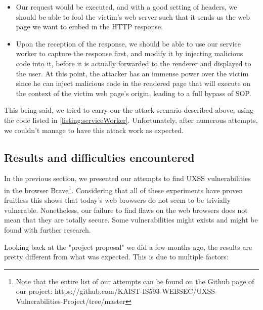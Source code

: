 \documentclass[journal]{IEEEtran}
\begin{document}
\begin{itemize}
\item Our request would be executed, and with a good setting of headers, we should be able to fool the victim's web server such that it sends us the web page we want to embed in the HTTP response.
\item Upon the reception of the response, we should be able to use our service worker to capture the response first, and modify it by injecting malicious code into it, before it is actually forwarded to the renderer and displayed to the user. At this point, the attacker has an immense power over the victim since he can inject malicious code in the rendered page that will execute on the context of the victim web page's origin, leading to a full bypass of SOP.
\end{itemize}

\medskip

This being said, we tried to carry our the attack scenario described above, using the code listed in \ref{listing:serviceWorker}. Unfortunately, after numerous attempts, we couldn't manage to have this attack work as expected. 


\subsection{Results and difficulties encountered}

In the previous section, we presented our attempts to find UXSS vulnerabilities in the browser Brave\footnote{Note that the entire list of our attempts can be found on the Github page of our project: https://github.com/KAIST-IS593-WEBSEC/UXSS-Vulnerabilities-Project/tree/master}. Considering that all of these experiments have proven fruitless this shows that today's web browsers do not seem to be trivially vulnerable. Nonetheless, our failure to find flaws on the web browsers does not mean that they are totally secure. Some vulnerabilities might exists and might be found with further research. 

\medskip

Looking back at the "project proposal" we did a few months ago, the results are pretty different from what was expected. This is due to multiple factors:
\end{document}
